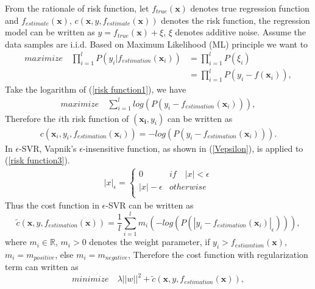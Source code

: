 \documentclass[12pt, draftclsnofoot, onecolumn]{IEEEtran}
\begin{document}
From the rationale of risk function, let $f_{true}(\mathbf{x})$ denotes true regression function and $f_{estimate}(\mathbf{x})$, $c(\mathbf{x},y,f_{estimate}(\mathbf{x}))$ denotes the risk function, the regression model can be written as $y=f_{true}(\mathbf{x})+\xi$, $\xi$ denotes additive noise. Assume the data samples are i.i.d. Based on Maximum Likelihood (ML) principle we want to  
\begin{eqnarray}
\nonumber
maximize\quad \prod_{i=1}^{l}P(y_{i}|f_{estimation}(\mathbf{x}_{i}))&=\prod_{i=1}^{l}P(\xi_{i})\\
&=\prod_{i=1}^{l}P(y_{i}-f(\mathbf{x}_{i})),
\label{risk function1}
\end{eqnarray}
Take the logarithm of (\ref{risk function1}), we have
\begin{eqnarray}
maximize\quad \sum_{i=1}^{l}log(P(y_{i}-f_{estimation}(\mathbf{x}_{i}))),
\label{risk function2}
\end{eqnarray}
Therefore the $i$th risk function of $(\mathbf{x_{i}}, y_{i})$ can be written as 
\begin{eqnarray}
c(\mathbf{x}_{i}, y_{i}, f_{estimation}(\mathbf{x}_{i}))=-log(P(y_{i}-f_{estimation}(\mathbf{x}_{i}))).
\label{risk function3}
\end{eqnarray}
In $\epsilon$-SVR, Vapnik's $\epsilon$-insensitive function, as shown in (\ref{Vepsilon}), is applied to (\ref{risk function3}).
\begin{eqnarray}
|x|_{\epsilon}=\left\{\begin{array}{ll}
0   &if\quad |x|<\epsilon\\
|x|-\epsilon  &otherwise\\
\end{array}\right.
\label{Vepsilon}
\end{eqnarray}
Thus the cost function in $\epsilon$-SVR can be written as 
\begin{equation}
\tilde{c}(\mathbf{x}, y, f_{estimation}(\mathbf{x}))=\frac{1}{l}\sum_{i=1}^{l}m_{i}(-log(P(|y_{i}-f_{estimation}(\mathbf{x}_{i})|_{\epsilon}))),
\label{cost function}
\end{equation}
where $m_{i}\in \mathbb{R}$, $m_{i}>0$ denotes the weight parameter, if $y_{i}>f_{estiamtion}(\mathbf{x})$, $m_{i}=m_{positive}$, else $m_{i}=m_{negative}$, Therefore the cost function with regularization term can written as 
\begin{equation}
minimize\quad \lambda||w||^{2}+\tilde{c}(\mathbf{x}, y, f_{estimation}(\mathbf{x})),
\label{total cost function}
\end{equation} 
\end{document}

